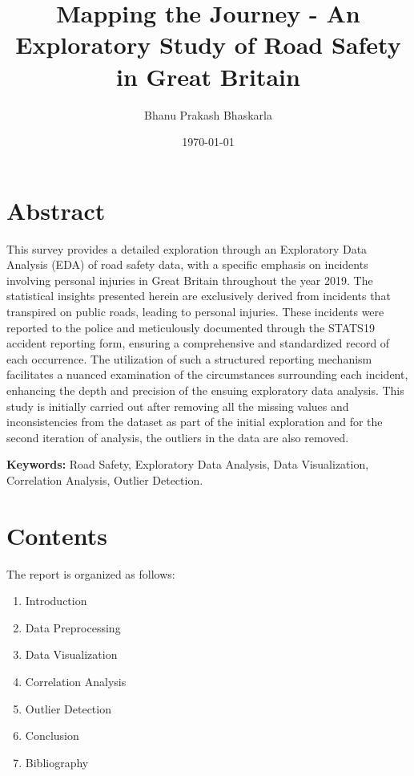 \documentclass{article}
\title{\textbf{Mapping the Journey - An Exploratory Study of Road Safety in Great Britain}}
\author{Bhanu Prakash Bhaskarla}
\date{\today}
\begin{document}
\maketitle

\section{Abstract}
This survey provides a detailed exploration through an Exploratory Data Analysis (EDA) of road safety data,
with a specific emphasis on incidents involving personal injuries in Great Britain throughout the year 2019.
The statistical insights presented herein are exclusively derived from incidents that transpired on public
roads, leading to personal injuries. These incidents were reported to the police and meticulously documented
through the STATS19 accident reporting form, ensuring a comprehensive and standardized record of each occurrence.
The utilization of such a structured reporting mechanism facilitates a nuanced examination of the circumstances
surrounding each incident, enhancing the depth and precision of the ensuing exploratory data analysis. This study
is initially carried out after removing all the missing values and inconsistencies from the dataset as part of the
initial exploration and for the second iteration of analysis, the outliers in the data are also removed.

\noindent\textbf{Keywords:} Road Safety, Exploratory Data Analysis, Data Visualization, Correlation Analysis,
Outlier Detection.

\section{Contents}
The report is organized as follows:
\begin{enumerate}
  \item Introduction
  \item Data Preprocessing
  \item Data Visualization
  \item Correlation Analysis
  \item Outlier Detection
  \item Conclusion
  \item Bibliography
\end{enumerate}

\end{document}
